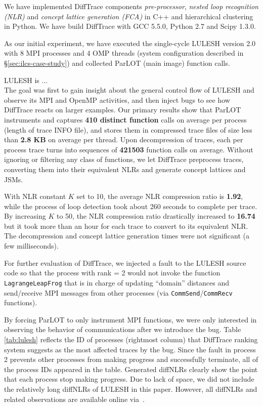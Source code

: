 


We have implemented DiffTrace components \textit{pre-processor}, \textit{nested loop recognition (NLR)} and \textit{concept lattice generation (FCA)} in C++ and hierarchical clustering in Python. 
We have build DiffTrace with GCC 5.5.0, Python 2.7 and Scipy 1.3.0.

As our initial experiment, we have executed the single-cycle LULESH version 2.0 with 8 MPI processes and 4 OMP threads (system configuration described in \S\ref{sec:ilcs-case-study}) and collected ParLOT (main image) function calls.
%

LULESH is ...\\

The goal was first to gain insight about the general control flow of LULESH and observe its MPI and OpenMP activities, and then inject bugs to see how DiffTrace reacts on larger examples. 
%
Our primary results show that ParLOT instruments and captures \textbf{410 distinct function} calls on average per process (length of trace INFO file), and stores them in compressed trace files of size less than \textbf{2.8 KB} on average per thread.
%
Upon decompression of traces, each per process trace turns into sequences of \textbf{421503} function calls on average.
%
Without ignoring or filtering any class of functions, we let DiffTrace preprocess traces, converting them into their equivalent NLRs and generate concept lattices and JSMs. 
%

With NLR constant $K$ set to 10, the average NLR compression ratio is \textbf{1.92}, while the process of loop detection took about 260 seconds to complete per trace.
%
By increasing $K$ to 50, the NLR compression ratio drastically increased to \textbf{16.74} but it took more than an hour for each trace to convert to its equivalent NLR. 
%
The decompression and concept lattice generation times were not significant (a few milliseconds).
%

For further evaluation of DiffTrace, we injected a fault to the LULESH source code so that the process with rank = 2 would not invoke the function \texttt{LagrangeLeapFrog} that is in charge of updating ``domain'' distances and send/receive MPI messages from other processes (via \texttt{CommSend}/\texttt{CommRecv} functions).
%

By forcing ParLOT to only instrument MPI functions, we were only interested in observing the behavior of communications after we introduce the bug.
%
Table \ref{tab:lulesh} reflects the ID of processes (rightmost column) that DiffTrace ranking system suggests as the most affected traces by the bug.
%
Since the fault in process 2 prevents other processes from making progress and successfully terminate, all of the process IDs appeared in the table. Generated diffNLRs clearly show the point that each process stop making progress. Due to lack of space, we did not include the relatively long diffNLRs of LULESH in this paper. However, all diffNLRs and related observations are available online via~\cite{diffTraceMaterials}.


